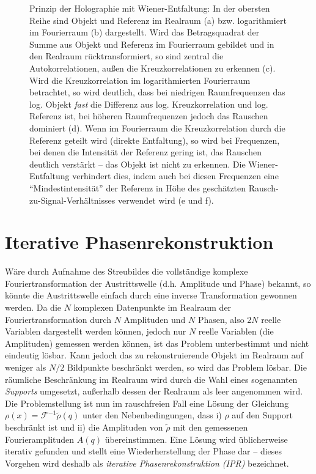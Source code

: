 \begin{figure}
	\centering
	\caption[Prinzip Enfaltung]{Prinzip der Holographie mit  Wiener-Entfaltung: In der obersten Reihe sind Objekt und Referenz im Realraum (a) bzw. logarithmiert im Fourierraum (b) dargestellt. Wird das Betragsquadrat der Summe aus Objekt und Referenz im Fourierraum gebildet und in den Realraum rücktransformiert, so sind zentral die Autokorrelationen, außen die Kreuzkorrelationen zu erkennen (c). Wird die Kreuzkorrelation im logarithmierten Fourierraum betrachtet, so wird deutlich, dass bei niedrigen Raumfrequenzen das log. Objekt \textit{fast} die Differenz aus log. Kreuzkorrelation und log. Referenz ist, bei höheren Raumfrequenzen jedoch das Rauschen dominiert (d). Wenn im Fourierraum die Kreuzkorrelation durch die Referenz geteilt wird (direkte Entfaltung), so wird bei Frequenzen, bei denen die Intensität der Referenz gering ist, das Rauschen deutlich verstärkt -- das Objekt ist nicht zu erkennen. Die Wiener-Entfaltung verhindert dies, indem auch bei diesen Frequenzen eine "`Mindestintensität"' der Referenz in Höhe des geschätzten Rausch-zu-Signal-Verhältnisses verwendet wird (e und f). }
	\label{fig:wiener}
\end{figure} 

\section{Iterative Phasenrekonstruktion}
Wäre durch Aufnahme des Streubildes die vollständige komplexe Fouriertransformation der Austrittswelle (d.h. Amplitude und Phase) bekannt, so könnte die Austrittswelle einfach durch eine inverse Transformation gewonnen werden. Da die $N$ komplexen Datenpunkte im Realraum der Fouriertransformation durch $N$ Amplituden und $N$ Phasen, also $2N$ reelle Variablen dargestellt werden können, jedoch nur $N$ reelle Variablen (die Amplituden) gemessen werden können, ist das Problem unterbestimmt und nicht eindeutig lösbar. Kann jedoch das zu rekonstruierende Objekt im Realraum auf weniger als $N/2$ Bildpunkte beschränkt werden, so wird das Problem lösbar. Die räumliche Beschränkung im Realraum wird durch die Wahl eines sogenannten \textit{Supports} umgesetzt, außerhalb dessen der Realraum als leer angenommen wird.  
Die Problemstellung ist nun im rauschfreien Fall eine Lösung der Gleichung $\rho(x)=\mathscr{F}^{-1}\tilde{\rho}(q)$ unter den Nebenbedingungen, dass i) $\rho$ auf den Support beschränkt ist und ii) die Amplituden von $\tilde{\rho}$ mit den gemessenen Fourieramplituden $A(q)$ übereinstimmen. Eine Lösung wird üblicherweise iterativ gefunden und stellt eine Wiederherstellung der Phase dar -- dieses Vorgehen wird deshalb als \textit{iterative Phasenrekonstruktion (IPR)} bezeichnet.
